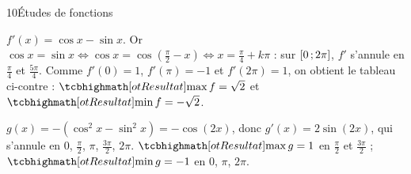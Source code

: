 \begin{corrige}{10}{Études de fonctions}
\noindent
\begin{minipage}[t]{0.52\linewidth}\vspace{0pt}\raggedright
\begin{questions}
  \item $f'(x)=\cos x-\sin x$. Or $\cos x=\sin x\iff\cos x=\cos\left(\frac{\pi}{2}-x\right)\iff x=\frac{\pi}{4}+k\pi$ : sur
    $\mathopen{[}0\,{;}\,2\pi\mathclose{]}$, $f'$ s'annule en $\frac{\pi}{4}$ et $\frac{5\pi}{4}$. Comme $f'(0)=1$, $f'(\pi)=-1$ et $f'(2\pi)=1$, on
    obtient le tableau ci-contre : $\res{\max f=\sqrt2}$ et $\res{\min f=-\sqrt2}$.
\end{questions}
\end{minipage}\hfill
\begin{minipage}[t]{0.44\linewidth}\vspace{1mm}
\centering
\begin{tableau}
\end{tableau}
\end{minipage}

\noindent
\begin{minipage}[t]{0.42\linewidth}\vspace{0pt}\raggedright
\begin{questions}[start=2]
  \item $g(x)=-\left(\cos^{2}x-\sin^{2}x\right)=-\cos(2x)$, donc $g'(x)=2\sin(2x)$, qui s'annule en $0$, $\frac{\pi}{2}$, $\pi$,
    $\frac{3\pi}{2}$, $2\pi$. $\res{\max g=1}$ en $\frac{\pi}{2}$ et $\frac{3\pi}{2}$ ; $\res{\min g=-1}$ en $0$, $\pi$, $2\pi$.
\end{questions}
\end{minipage}\hfill
\begin{minipage}[t]{0.54\linewidth}\vspace{1mm}
\centering
\begin{tableau}
\end{tableau}
\end{minipage}


\end{corrige}
